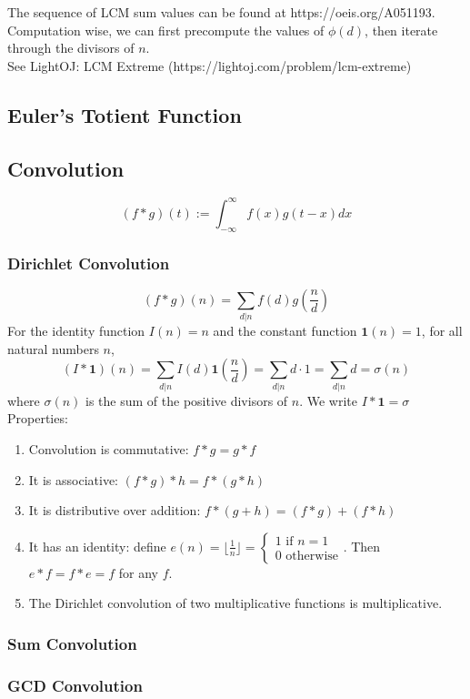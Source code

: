 \documentclass[12pt]{extarticle}
\begin{document}
The sequence of LCM sum values can be found at https://oeis.org/A051193.\\
Computation wise, we can first precompute the values of $\phi(d)$, then iterate through the divisors of $n$.\\
See LightOJ: LCM Extreme (https://lightoj.com/problem/lcm-extreme)

\subsection*{Euler's Totient Function}

\subsection*{Convolution}
$$(f*g)(t) := \int_{-\infty}^{\infty}f(x)g(t-x)dx$$
\subsubsection*{Dirichlet Convolution}
$$(f*g)(n)=\sum_{d|n}f(d)g(\frac{n}{d})$$
For the identity function $I(n)=n$ and the constant function $\mathbf{1}(n)=1$, for all natural numbers $n$, $$(I * \mathbf{1})(n)=\sum_{d|n}I(d)\mathbf{1}(\frac{n}{d})=\sum_{d|n}d\cdot 1=\sum_{d|n}d=\sigma(n)$$ where $\sigma(n)$ is the sum of the positive divisors of $n$. We write $I*\mathbf{1}=\sigma$\\
Properties:
\begin{enumerate}
\item Convolution is commutative: $f*g=g*f$
\item It is associative: $(f*g)*h=f*(g*h)$
\item It is distributive over addition: $f*(g+h)=(f*g)+(f*h)$
\item It has an identity: define $e(n)=\lfloor\frac{1}{n}\rfloor=\begin{cases}1 \text{ if } n=1 \\ 0 \text{ otherwise} \end{cases}$. Then $e*f=f*e=f$ for any $f$.
\item The Dirichlet convolution of two multiplicative functions is multiplicative.
\end{enumerate}
\subsubsection*{Sum Convolution}
\subsubsection*{GCD Convolution}
\end{document}

